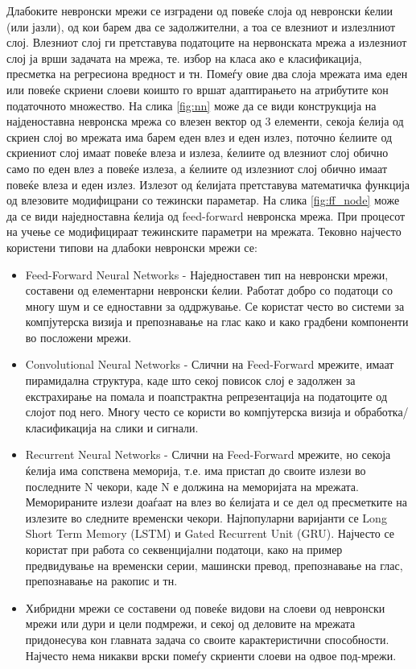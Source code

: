 Длабоките невронски мрежи се изградени од повеќе слоја од невронски ќелии (или јазли), од кои барем два се задолжителни, а тоа се влезниот и излезлниот слој. Влезниот слој ги претставува податоците на нервонската мрежа а излезниот слој ја врши задачата на мрежа, те. избор на класа ако е класификација, пресметка на регресиона вредност и тн. Помеѓу овие два слоја мрежата има еден или повеќе скриени слоеви коишто го вршат адаптирањето на атрибутите кон податочното множество. На слика \ref{fig:nn} може да се види конструкција на најденоставна невронска мрежа со влезен вектор од 3 елементи, секоја ќелија од скриен слој во мрежата има барем еден влез и еден излез, поточно ќелиите од скриениот слој имаат повеќе влеза и излеза, ќелиите од влезниот слој обично само по еден влез а повеќе излеза, а ќелиите од излезниот слој обично имаат повеќе влеза и еден излез. Излезот од ќелијата претставува математичка функција од влезовите модифицрани со тежински параметар. На слика \ref{fig:ff_node} може да се види наједноставна ќелија од feed-forward невронска мрежа. При процесот на учење се модифицираат тежинските параметри на мрежата.
Тековно најчесто користени типови на длабоки невронски мрежи се:
\begin{itemize}
    \item Feed-Forward Neural Networks - Наједноставен тип на невронски мрежи, составени од елементарни невронски ќелии. Работат добро со податоци со многу шум и се едноставни за оддржување. Се користат често во системи за компјутерска визија и препознавање на глас како и како градбени компоненти во посложени мрежи.
    \item Convolutional Neural Networks - Слични на Feed-Forward мрежите, имаат пирамидална структура, каде што секој повисок слој е задолжен за екстрахирање на помала и поапстрактна репрезентација на податоците од слојот под него. Многу често се користи во компјутерска визија и обработка/класификација на слики и сигнали.
    \item Recurrent Neural Networks - Слични на Feed-Forward мрежите, но секоја ќелија има сопствена меморија, т.е. има пристап до своите излези во последните N чекори, каде N е должина на меморијата на мрежата. Меморираните излези доаѓаат на влез во ќелијата и се дел од пресметките на излезите во следните временски чекори. Најпопуларни варијанти се Long Short Term Memory (LSTM) и Gated Recurrent Unit (GRU). Најчесто се користат при работа со секвенцијални податоци, како на пример предвидување на временски серии, машински превод, препознавање на глас, препознавање на ракопис и тн.
    \item Хибридни мрежи се составени од повеќе видови на слоеви од невронски мрежи или дури и цели подмрежи, и секој од деловите на мрежата придонесува кон главната задача со своите карактеристични способности. Најчесто нема никакви врски помеѓу скриенти слоеви на одвое под-мрежи.
\end{itemize}

